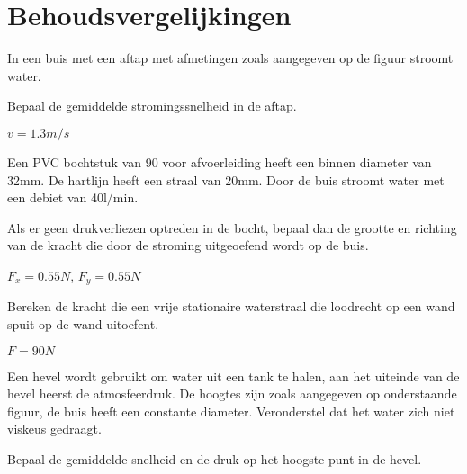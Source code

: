 \chapter{Behoudsvergelijkingen}
\label{sec:Behoudsvergelijkingen}
	\begin{toepassing}
		\label{buisaftap}
In een buis met een aftap met afmetingen zoals aangegeven op de figuur stroomt water.
		
Bepaal de gemiddelde stromingssnelheid in de aftap.
		\begin{center}
			
		\end{center}
	\end{toepassing}
	\begin{antwoord}
		$v = \unit{1.3}{m/s}$
	\end{antwoord}
	\begin{toepassing}
		\label{afvoerbocht}
Een PVC bochtstuk van \unit{90}{\degree} voor afvoerleiding heeft een binnen diameter van \unit{32}{mm}. De hartlijn heeft een straal van \unit{20}{mm}. Door de buis stroomt water met een debiet van \unit{40}{l/min}.
		
Als er geen drukverliezen optreden in de bocht, bepaal dan de grootte en richting van de kracht die door de stroming uitgeoefend wordt op de buis.
		\begin{center}
			
		\end{center}
	\end{toepassing}
	\begin{antwoord}
		$F_x = \unit{0.55}{N}$, $F_y = \unit{0.55}{N}$
	\end{antwoord}
	\begin{toepassing}
		\label{waterstraal}
Bereken de kracht die een vrije stationaire waterstraal die loodrecht op een wand spuit op de wand uitoefent.
		\begin{center}
			
		\end{center}
	\end{toepassing}
	\begin{antwoord}
		$F = \unit{90}{N}$
	\end{antwoord}
	\begin{toepassing}
		\label{hevel}
Een hevel wordt gebruikt om water uit een tank te halen, aan het uiteinde van de hevel heerst de atmosfeerdruk. De hoogtes zijn zoals aangegeven op onderstaande figuur, de buis heeft een constante diameter. Veronderstel dat het water zich niet viskeus gedraagt.
		
Bepaal de gemiddelde snelheid en de druk op het hoogste punt in de hevel.
		\begin{center}
			
		\end{center}
	\end{toepassing}
